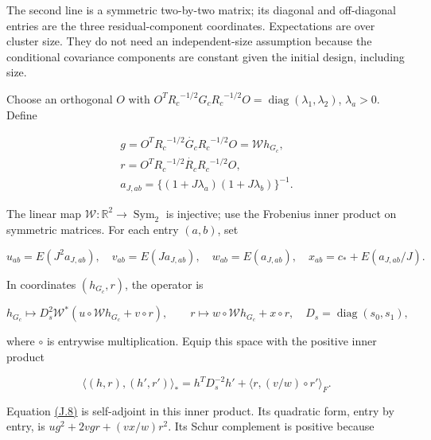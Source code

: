 \documentclass[11pt]{article}
\begin{document}
The second line is a symmetric two-by-two matrix; its diagonal and off-diagonal entries are the three residual-component coordinates. Expectations are over cluster size. They do not need an independent-size assumption because the conditional covariance components are constant given the initial design, including size.

Choose an orthogonal \(O\) with
\(O^T{R_c}^{-1/2}{G_c}{R_c}^{-1/2}O=\operatorname{diag}(\lambda_1,\lambda_2)\), \(\lambda_a>0\). Define

\begin{equation*}
\begin{gathered}
g=O^T{R_c}^{-1/2}\dot {G_c} {R_c}^{-1/2}O=\mathscr W h_{G_c}, \\
r=O^T{R_c}^{-1/2}\dot {R_c} {R_c}^{-1/2}O, \\
a_{J,ab}=\{(1+J\lambda_a)(1+J\lambda_b)\}^{-1}.
\end{gathered}
\tag{J.6}\label{eq:J.6}
\end{equation*}

The linear map \(\mathscr W:\mathbb R^2\to\operatorname{Sym}_2\) is injective; use the Frobenius inner product on symmetric matrices. For each entry \((a,b)\), set

\begin{equation*}
u_{ab}=E(J^2a_{J,ab}),\quad v_{ab}=E(Ja_{J,ab}),\quad
w_{ab}=E(a_{J,ab}),\quad x_{ab}=c_*+E(a_{J,ab}/J).
\tag{J.7}\label{eq:J.7}
\end{equation*}

In coordinates \((h_{G_c},r)\), the operator is

\begin{equation*}
h_{G_c}\longmapsto D_s^2\mathscr W^*(u\circ\mathscr W h_{G_c}+v\circ r),\qquad
r\longmapsto w\circ\mathscr W h_{G_c}+x\circ r,
\quad D_s=\operatorname{diag}(s_0,s_1),
\tag{J.8}\label{eq:J.8}
\end{equation*}

where \(\circ\) is entrywise multiplication. Equip this space with the positive inner product

\begin{equation*}
\langle(h,r),(h',r')\rangle_*
 =h^TD_s^{-2}h'+\langle r,(v/w)\circ r'\rangle_F.
\tag{J.9}\label{eq:J.9}
\end{equation*}

Equation \hyperref[eq:J.8]{(J.8)} is self-adjoint in this inner product. Its quadratic form, entry by entry, is
\(u g^2+2vgr+(vx/w)r^2\). Its Schur complement is positive because
\end{document}
